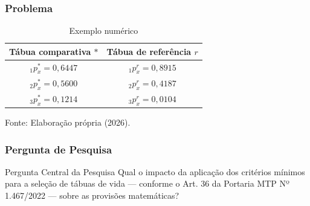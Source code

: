 \documentclass[11pt]{beamer}
\newcommand{\fonte}[1]{%
    \par
    \raggedright
    {Fonte: #1}
}
\begin{document}
    \begin{frame}

        \frametitle{Problema}

            \begin{table}
            \centering
            \caption{Exemplo numérico}
                \begin{tabular}{c|c} \hline
                \textbf{Tábua comparativa $*$} & \textbf{Tábua de referência $r$} \\ \hline

                ${}_{1}p^{*}_x = 0{,}6447$ & ${}_{1}p^{r}_x = 0{,}8915$ \\

                ${}_{2}p^{*}_x = 0{,}5600$ & ${}_{2}p^{r}_x = 0{,}4187$ \\

                ${}_{3}p^{*}_x = 0{,}1214$ & ${}_{3}p^{r}_x = 0{,}0104$ \\ \hline

                \end{tabular}
                \vspace{0.25cm}
                \fonte{Elaboração própria (2026).}
            \end{table}
            
            \begin{center}
            \end{center}
            
            \begin{center}
            \end{center}
    \end{frame}
    
    \begin{frame}
        
        \frametitle{Pergunta de Pesquisa}

            \begin{alertblock}{Pergunta Central da Pesquisa}
                Qual o impacto da aplicação dos critérios mínimos para a seleção de tábuas de vida — conforme o Art. 36 da Portaria MTP Nº 1.467/2022 — sobre as provisões matemáticas?
            \end{alertblock}

    \end{frame}
\end{document}
